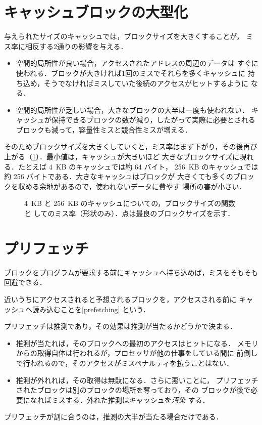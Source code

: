 \documentclass[../main.tex]{subfiles}
\begin{document}
\section{キャッシュブロックの大型化}
\label{sec:l14-block-size}

与えられたサイズのキャッシュでは，ブロックサイズを大きくすることが，
ミス率に相反する2通りの影響を与える．
\begin{itemize}
  \item 空間的局所性が良い場合，アクセスされたアドレスの周辺のデータは
    すぐに使われる．ブロックが大きければ1回のミスでそれらを多くキャッシュに
    持ち込め，そうでなければミスしていた後続のアクセスがヒットするように
    なる．
  \item 空間的局所性が乏しい場合，大きなブロックの大半は一度も使われない．
    キャッシュが保持できるブロックの数が減り，したがって実際に必要とされる
    ブロックも減って，容量性ミスと競合性ミスが増える．
\end{itemize}
そのためブロックサイズを大きくしていくと，ミス率はまず下がり，その後再び
上がる（\cref{fig:l14-block-size}）．最小値は，キャッシュが大きいほど
大きなブロックサイズに現れる．たとえば 4~KB のキャッシュでは約 64 バイト，
256~KB のキャッシュでは約 256 バイトである．大きなキャッシュはブロックが
大きくても多くのブロックを収める余地があるので，使われないデータに費やす
場所の害が小さい．

\begin{figure}[htbp]
  \centering
  
  \caption{4~KB と 256~KB のキャッシュについての，ブロックサイズの関数と
    してのミス率（形状のみ）．点は最良のブロックサイズを示す．}
  \label{fig:l14-block-size}
\end{figure}

\section{プリフェッチ}
\label{sec:l14-prefetching}

ブロックをプログラムが要求する前にキャッシュへ持ち込めば，ミスをそもそも
回避できる．

\begin{definition}[プリフェッチ]
  近いうちにアクセスされると予想されるブロックを，アクセスされる前に
  キャッシュへ読み込むことを[prefetching]%
  という．
\end{definition}

プリフェッチは推測であり，その効果は推測が当たるかどうかで決まる．
\begin{itemize}
  \item 推測が当たれば，そのブロックへの最初のアクセスはヒットになる．
    メモリからの取得自体は行われるが，プロセッサが他の仕事をしている間に
    前倒しで行われるので，そのアクセスがミスペナルティを払うことはない．
  \item 推測が外れれば，その取得は無駄になる．さらに悪いことに，
    プリフェッチされたブロックは別のブロックの場所を奪っており，その
    ブロックが後で必要になればミスする．外れた推測はキャッシュを\emph{汚染}
    する．
\end{itemize}
プリフェッチが割に合うのは，推測の大半が当たる場合だけである．
\end{document}
